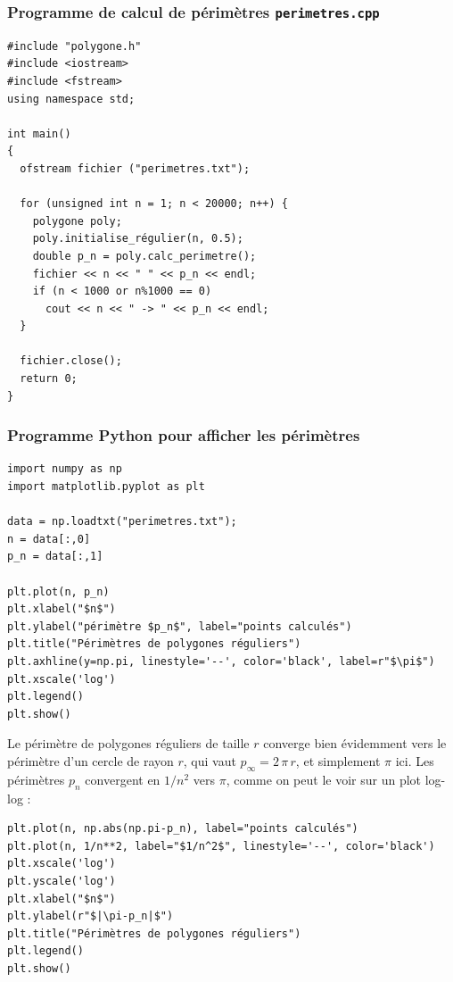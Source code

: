 \documentclass{book}
\begin{document}
\begin{correction}
\subsubsection*{Programme de calcul de périmètres \texttt{perimetres.cpp}}
\begin{verbatim}
#include "polygone.h"
#include <iostream>
#include <fstream>
using namespace std;

int main()
{
  ofstream fichier ("perimetres.txt");

  for (unsigned int n = 1; n < 20000; n++) {
    polygone poly;
    poly.initialise_régulier(n, 0.5);
    double p_n = poly.calc_perimetre();
    fichier << n << " " << p_n << endl;
    if (n < 1000 or n%1000 == 0)
      cout << n << " -> " << p_n << endl;
  }

  fichier.close();
  return 0;
}
\end{verbatim}

\subsubsection*{Programme Python pour afficher les périmètres}

\begin{verbatim}
import numpy as np
import matplotlib.pyplot as plt

data = np.loadtxt("perimetres.txt");
n = data[:,0]
p_n = data[:,1]

plt.plot(n, p_n)
plt.xlabel("$n$")
plt.ylabel("périmètre $p_n$", label="points calculés")
plt.title("Périmètres de polygones réguliers")
plt.axhline(y=np.pi, linestyle='--', color='black', label=r"$\pi$")
plt.xscale('log')
plt.legend()
plt.show()
\end{verbatim}

Le périmètre de polygones réguliers de taille $r$ converge bien évidemment vers le périmètre d'un cercle de rayon $r$, qui vaut $p_\infty=2\,\pi\,r$, et simplement $\pi$ ici. Les périmètres $p_n$ convergent en $1/n^2$ vers $\pi$, comme on peut le voir sur un plot log-log :
\begin{verbatim}
plt.plot(n, np.abs(np.pi-p_n), label="points calculés")
plt.plot(n, 1/n**2, label="$1/n^2$", linestyle='--', color='black')
plt.xscale('log')
plt.yscale('log')
plt.xlabel("$n$")
plt.ylabel(r"$|\pi-p_n|$")
plt.title("Périmètres de polygones réguliers")
plt.legend()
plt.show()
\end{verbatim}


\end{correction}
\end{document}
